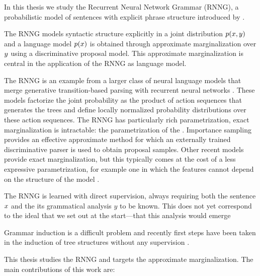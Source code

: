 In this thesis we study the Recurrent Neural Network Grammar (RNNG), a probabilistic model of sentences with explicit phrase structure introduced by \citet{dyer2016rnng}.

The RNNG models syntactic structure explicitly in a joint distribution $p( x, y )$ and a language model $p(x)$ is obtained through approximate marginalization over $y$ using a discriminative proposal model.  This approximate marginalization is central in the application of the RNNG as language model.

The RNNG is an example from a larger class of neural language models that merge generative transition-based parsing with recurrent neural networks \citep{dyer2016rnng,buys2015generative,buys2018exact}. These models factorize the joint probability as the product of action sequences that generates the trees and define locally normalized probability distributions over these action sequences. The RNNG \citep{dyer2016rnng} has particularly rich parametrization, exact marginalization is intractable: the parametrization of the . Importance sampling provides an effective approximate method for which an externally trained discriminative parser is used to obtain proposal samples. Other recent models provide exact marginalization, but this typically comes at the cost of a less expressive parametrization, for example one in which the features cannot depend on the structure of the model \citep{buys2018exact}.

The RNNG is learned with direct supervision, always requiring both the sentence $x$ and the its grammatical analysis $y$ to be known. This does not yet correspond to the ideal that we set out at the start---that this analysis would emerge

Grammar induction is a difficult problem \citep{klein grammar etc} and recently first steps have been taken in the induction of tree structures without any supervision \cite{tree gumbel stuff}.



This thesis studies the RNNG and targets the approximate marginalization. The main contributions of this work are:

